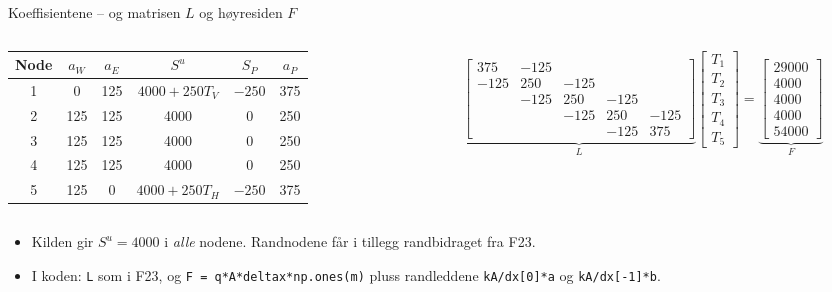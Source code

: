 \documentclass[11pt,aspectratio=169]{beamer}
\begin{document}
\begin{frame}{Koeffisientene -- og matrisen $L$ og høyresiden $F$}
\begin{columns}[c]
\begin{column}{0.47\textwidth}
\centering\scriptsize
\setlength{\tabcolsep}{3pt}
\begin{tabular}{cccccc}
\toprule
Node & $a_W$ & $a_E$ & $S^u$ & $S_P$ & $a_P$ \\
\midrule
1 & 0 & 125 & $4000+250T_V$ & $-250$ & 375 \\
2 & 125 & 125 & 4000 & 0 & 250 \\
3 & 125 & 125 & 4000 & 0 & 250 \\
4 & 125 & 125 & 4000 & 0 & 250 \\
5 & 125 & 0 & $4000+250T_H$ & $-250$ & 375 \\
\bottomrule
\end{tabular}
\end{column}
\begin{column}{0.51\textwidth}
\scriptsize
\setlength{\arraycolsep}{2.5pt}
\[
\underbrace{\begin{bmatrix}
375 & -125 & & & \\
-125 & 250 & -125 & & \\
 & -125 & 250 & -125 & \\
 & & -125 & 250 & -125 \\
 & & & -125 & 375
\end{bmatrix}}_{L}
\begin{bmatrix} T_1\\T_2\\T_3\\T_4\\T_5 \end{bmatrix}
=
\underbrace{\begin{bmatrix} 29000\\4000\\4000\\4000\\54000 \end{bmatrix}}_{F}
\]
\end{column}
\end{columns}
\vspace{0.4em}
\begin{itemize}
\item Kilden gir $S^u = 4000$ i \emph{alle} nodene. Randnodene får i tillegg randbidraget fra F23.
\item I koden: \texttt{L} som i F23, og \texttt{F = q*A*deltax*np.ones(m)} pluss randleddene \texttt{kA/dx[0]*a} og \texttt{kA/dx[-1]*b}.
\end{itemize}
\end{frame}
\end{document}
